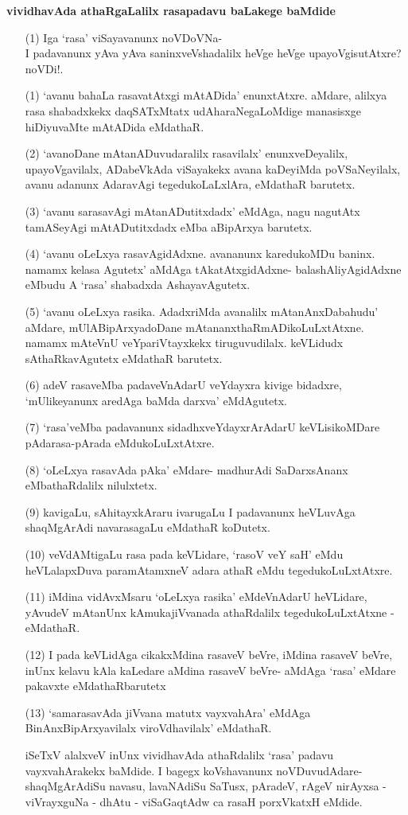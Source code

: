 {\bigskip
\noindent
{\large\bf vividhavAda athaRgaLalilx rasapadavu baLakege baMdide}}\label{page217}

\begin{itemize}
\item[(1)] Iga `rasa' viSayavanunx noVDoVNa-\\
I padavanunx yAva yAva saninxveVshadalilx heVge heVge upayoVgisutAtxre? noVDi!.
\item[(1)] `avanu bahaLa rasavatAtxgi mAtADida' enunxtAtxre. aMdare, alilxya rasa shabadxkekx daqSATxMtatx udAharaNegaLoMdige mana\-sisxge hiDiyuvaMte mAtADida eMdathaR.
\item[(2)] `avanoDane mAtanADuvudaralilx rasavilalx' enunxveDeyalilx, upayoVga\-vilalx, ADabeVkAda viSa\-yakekx avana kaDeyiMda poVSaNeyilalx, avanu adanunx AdaravAgi tegedukoLaLxlAra, eMdathaR barutetx.
\item[(3)] `avanu sarasavAgi mAtanADutitxdadx' eMdAga, nagu nagutAtx tamASeyAgi mAtADutitxdadx eMba aBipArxya barutetx.
\item[(4)] `avanu oLeLxya rasavAgidAdxne. avananunx karedukoMDu baninx. namamx kelasa Agutetx' aMdAga tAkatAtxgidAdxne- balashAliyAgidAdxne eMbudu A `rasa' shabadxda AshayavAgutetx. 
\item[(5)] `avanu oLeLxya rasika. AdadxriMda avanalilx mAtanAnxDabahudu' aMdare, mUlABipArxya\-doDane mAtananxthaRmADikoLuLxtAtxne. namamx mAteVnU veYpariVtayxkekx tiruguvudilalx. keVLidudx sAthaRka\-vAgutetx eMdathaR barutetx.
\item[(6)] adeV rasaveMba padaveVnAdarU veYdayxra kivige bidadxre, `mUlikeyanunx aredAga baMda darxva' eMdA\-gutetx.
\item[(7)] `rasa'veMba padavanunx sidadhxveYdayxrArAdarU keVLisikoMDare pAdarasa-pArada eMdukoLuLxtAtxre.
\item[(8)] `oLeLxya rasavAda pAka' eMdare- madhurAdi SaDarxsAnanx eMbathaRdalilx nilulxtetx.
\item[(9)] kavigaLu, sAhitayxkAraru ivarugaLu I padavanunx heVLuvAga shaqMgArAdi navarasagaLu eMdathaR koDutetx.
\item[(10)] veVdAMtigaLu rasa pada keVLidare, `rasoV veY saH'\label{223} eMdu heVLalapxDuva paramAtamxneV adara athaR eMdu tegedukoLuLxtAtxre.
\item[(11)] iMdina vidAvxMsaru `oLeLxya rasika' eMdeVnAdarU heVLidare, yAvudeV mAtanUnx kAmuka\-jiVvanada athaRdalilx tegedukoLuLxtAtxne - eMdathaR.
\item[(12)] I pada keVLidAga cikakxMdina rasaveV beVre, iMdina rasaveV beVre, inUnx kelavu kAla kaLedare aMdina rasaveV beVre- aMdAga `rasa' eMdare pakavxte eMdathaRbarutetx
\item[(13)] `samarasavAda jiVvana matutx vayxvahAra' eMdAga BinAnxBipArxyavilalx viroVdhavilalx' eMdathaR. 

iSeTxV alalxveV inUnx vividhavAda athaRdalilx `rasa' padavu vayxvahArakekx baMdide. I bagegx koVsha\-vanunx noVDuvudAdare- shaqMgArAdiSu navasu, lavaNAdiSu SaTusx, pAradeV, rAgeV nirAyxsa - viVrayxguNa - dhAtu - viSaGaqtAdw ca rasaH porxVkatxH eMdide.
\end{itemize}


